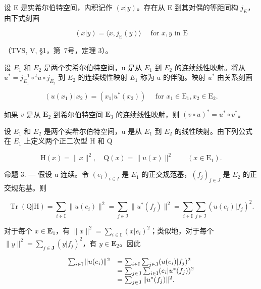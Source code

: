 
设 E 是实希尔伯特空间，内积记作 \((x|y)\)。存在从 E 到其对偶的等距同构 \(j_{E}\)，由下式刻画

\[
(x | y) = \langle x, j _ {\mathrm{E}} (y) \rangle \quad \text { for } x, y \text { in } \mathrm{E}\tag{3}
\]

（TVS, V, §1，第~7号，定理 3）。

设 \(E_{1}\) 和 \(E_{2}\) 是两个实希尔伯特空间，u 是从 \(E_{1}\) 到 \(E_{2}\) 的连续线性映射。将从 \(u^{*} = j_{E_{1}}^{-1} \circ {}^{t}u \circ j_{E_{2}}\) 到 \(E_{2}\) 的连续线性映射 \(E_{1}\) 称为 u 的伴随。映射 \(u^{*}\) 由关系刻画

\[
(u (x _ {1}) | x _ {2}) = (x _ {1} | u ^ {*} (x _ {2})) \quad \text { for } x _ {1} \in \mathrm{E} _ {1}, x _ {2} \in \mathrm{E} _ {2}.\tag{4}
\]

如果 \(v\) 是从 \(\mathbf{E}_2\) 到希尔伯特空间 \(\mathbf{E}_3\) 的连续线性映射，则 \((v \circ u)^* = u^* \circ v^*\)。

设 \(E_{1}\) 和 \(E_{2}\) 是两个实希尔伯特空间，u 是从 \(E_{1}\) 到 \(E_{2}\) 的线性映射。由下列公式在 \(E_{1}\) 上定义两个正二次型 H 和 Q

\[
\mathrm{H} (x) = \| x \| ^ {2}, \quad \mathrm{Q} (x) = \| u (x) \| ^ {2} \qquad (x \in \mathrm{E} _ {1}).
\]

命题 3. --- 假设 u 连续。令 \((e_{i})_{i\in I}\) 是 \(E_{1}\) 的正交规范基，\((f_{j})_{j\in J}\) 是 \(E_{2}\) 的正交规范基。则

\[
\operatorname{Tr} (\mathrm{Q} | \mathrm{H}) = \sum_ {i \in \mathrm{I}} \| u (e _ {i}) \| ^ {2} = \sum_ {j \in \mathrm{J}} \| u ^ {*} (f _ {j}) \| ^ {2} = \sum_ {i \in \mathrm{I}} \sum_ {j \in \mathrm{J}} (u (e _ {i}) | f _ {j}) ^ {2}.
\]

对于每个 \(x \in \mathbf{E}_1\)，有 \(\|x\|^2 = \sum_{i \in \mathbf{I}} (x|e_i)^2\)；类似地，对于每个 \(\|y\|^2 = \sum_{j \in \mathbf{J}} (y|f_j)^2\)，有 \(y \in \mathbf{E}_2\)。因此

\[
\begin{array}{r l} \sum_ {i \in \mathrm{I}} \| u (e _ {i}) \| ^ {2} & = \sum_ {i \in \mathrm{I}} \sum_ {j \in \mathrm{J}} (u (e _ {i}) | f _ {j}) ^ {2} \\ & = \sum_ {j \in \mathrm{J}} \sum_ {i \in \mathrm{I}} (e _ {i} | u ^ {*} (f _ {j})) ^ {2} \\ & = \sum_ {j \in \mathrm{J}} \| u ^ {*} (f _ {j}) \| ^ {2}. \end{array}
\]

